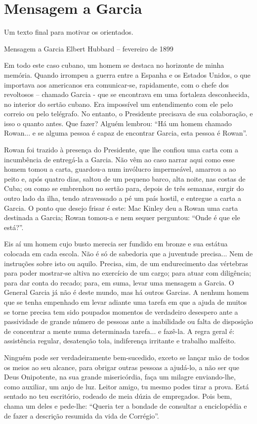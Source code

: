 \chapter{Mensagem a Garcia}
\label{chap:garcia}
Um texto final para motivar os orientados.

Mensagem a Garcia Elbert Hubbard – fevereiro de 1899

Em todo este caso cubano, um homem se destaca no horizonte de minha memória. Quando irrompeu a guerra entre a Espanha e os Estados Unidos, o que importava aos americanos era comunicar-se, rapidamente, com o chefe dos revoltosos – chamado Garcia - que se encontrava em uma fortaleza desconhecida, no interior do sertão cubano. Era impossível um entendimento com ele pelo correio ou pelo telégrafo. No entanto, o Presidente precisava de sua colaboração, e isso o quanto antes. Que fazer? Alguém lembrou: ``Há um homem chamado Rowan... e se alguma pessoa é capaz de encontrar Garcia, esta pessoa é Rowan''.

Rowan foi trazido à presença do Presidente, que lhe confiou uma carta com a incumbência de entregá-la a Garcia. Não vêm ao caso narrar aqui como esse homem tomou a carta, guardou-a num invólucro impermeável, amarrou a ao peito e, após quatro dias, saltou de um pequeno barco, alta noite, nas costas de Cuba; ou como se embrenhou no sertão para, depois de três semanas, surgir do outro lado da ilha, tendo atravessado a pé um país hostil, e entregue a carta a Garcia. O ponto que desejo frisar é este: Mac Kinley deu a Rowan uma carta destinada a Garcia; Rowan tomou-a e nem sequer perguntou: ``Onde é que ele está?''.

Eis aí um homem cujo busto merecia ser fundido em bronze e sua estátua colocada em cada escola. Não é só de sabedoria que a juventude precisa... Nem de instruções sobre isto ou aquilo. Precisa, sim, de um endurecimento das vértebras para poder mostrar-se altiva no exercício de um cargo; para atuar com diligência; para dar conta do recado; para, em suma, levar uma mensagem a Garcia. O General Garcia já não é deste mundo, mas há outros Garcias. A nenhum homem que se tenha empenhado em levar adiante uma tarefa em que a ajuda de muitos se torne precisa tem sido poupados momentos de verdadeiro desespero ante a passividade de grande número de pessoas ante a inabilidade ou falta de disposição de concentrar a mente numa determinada tarefa... e fazê-la. A regra geral é: assistência regular, desatenção tola, indiferença irritante e trabalho malfeito.

Ninguém pode ser verdadeiramente bem-sucedido, exceto se lançar mão de todos os meios ao seu alcance, para obrigar outras pessoas a ajudá-lo, a não ser que Deus Onipotente, na sua grande misericórdia, faça um milagre enviando-lhe, como auxiliar, um anjo de luz. Leitor amigo, tu mesmo podes tirar a prova. Está sentado no teu escritório, rodeado de meia dúzia de empregados. Pois bem, chama um deles e pede-lhe: ``Queria ter a bondade de consultar a enciclopédia e de fazer a descrição resumida da vida de Corrégio''.

